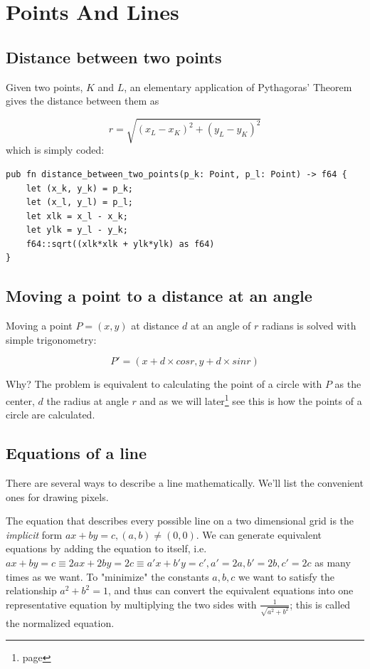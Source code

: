 \documentclass[12pt,openany,a4,usenames,dvipsnames]{book}
\newcommand\pixels{{\pixelfont{}pixels}}
\begin{document}
\part{Points And Lines}
\chapter{Distance between two points}

\begin{figure}[H]
\centering

\end{figure}

Given two points, $K$ and $L$, an elementary application of Pythagoras' Theorem gives the distance between them as

\begin{equation}
  r = \sqrt{(x_{L} - x_{K})^{2} +(y_{L} - y_{K})^{2}}
\end{equation}
which is simply coded:
\begin{verbatim}
pub fn distance_between_two_points(p_k: Point, p_l: Point) -> f64 {
    let (x_k, y_k) = p_k;
    let (x_l, y_l) = p_l;
    let xlk = x_l - x_k;
    let ylk = y_l - y_k;
    f64::sqrt((xlk*xlk + ylk*ylk) as f64)
}
\end{verbatim}
\chapter{Moving a point to a distance at an angle}

Moving a point $P=(x,y)$ at distance $d$ at an angle of $r$ radians is solved with simple trigonometry:

$$P'=(x+d\times{}cosr, y+d\times{}sinr)$$

Why? The problem is equivalent to calculating the point of a circle with $P$ as the center, $d$ the radius at angle $r$ and as we will later\footnote{\emph{} page \pageref{ch:equations-circles}} see this is how the points of a circle are calculated.

\chapter{Equations of a line}\label{ch:equations-lines}
There are several ways to describe a line mathematically. We'll list the convenient ones for drawing \pixels{}.

The equation that describes every possible line on a two dimensional grid is the \emph{implicit} form $ax+by=c, (a,b) \neq{} (0,0)$. We can generate equivalent equations by adding the equation to itself, i.e. $ax+by=c \equiv 2ax+2by=2c \equiv a'x+b'y=c', a'=2a, b'=2b, c'=2c$ as many times as we want. To "minimize" the constants $a,b,c$ we want to satisfy the relationship $a^{2}+b^{2}=1$, and thus can convert the equivalent equations into one representative equation by multiplying the two sides with $\frac{1}{\sqrt{a^2+b^2}}$; this is called the normalized equation. %
\end{document}
